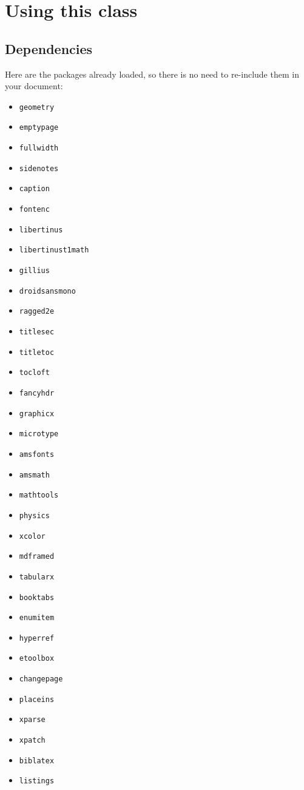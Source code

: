 
\chapter{Using this class}

\section{Dependencies}

Here are the packages already loaded, so there is no need to re-include them in your document:

\begin{wide}
	\begin{multicols}{4}
		\begin{itemize}
			\item\texttt{geometry}
			\item\texttt{emptypage}
			\item\texttt{fullwidth}
			\item\texttt{sidenotes}
			\item\texttt{caption}
			\item\texttt{fontenc}
			\item\texttt{libertinus}
			\item\texttt{libertinust1math}
			\item\texttt{gillius}
			\item\texttt{droidsansmono}
			\item\texttt{ragged2e}
			\item\texttt{titlesec}
			\item\texttt{titletoc}
			\item\texttt{tocloft}
			\item\texttt{fancyhdr}
			\item\texttt{graphicx} \item\texttt{microtype} \item\texttt{amsfonts} \item\texttt{amsmath} \item\texttt{mathtools} \item\texttt{physics} \item\texttt{xcolor} \item\texttt{mdframed} \item\texttt{tabularx} \item\texttt{booktabs} \item\texttt{enumitem} \item\texttt{hyperref} \item\texttt{etoolbox} \item\texttt{changepage} \item\texttt{placeins} \item\texttt{xparse} \item\texttt{xpatch} \item\texttt{biblatex} \item\texttt{listings}
		\end{itemize}
	\end{multicols}
\end{wide}

